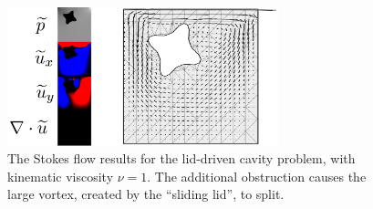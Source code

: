\begin{figure}[H]
    \centering
    \centerline{\includegraphics[width=0.7\textwidth]{figures/stokes/lid_driven_obstruction/figure.png}}
    \caption{\tiny
        The Stokes flow results for the lid-driven cavity problem, with kinematic viscosity $\nu = 1$.
        The additional obstruction causes the large vortex, created by the ``sliding lid'', to split.
    }
    \label{stokes_lid_driven_obstruction}
\end{figure}
\newpage
